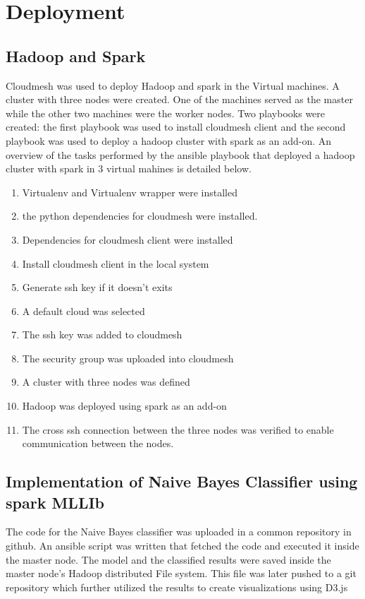 \documentclass[9pt,twocolumn,twoside]{styles/osajnl}
\begin{document}
\section{Deployment}
\subsection{Hadoop and Spark}
Cloudmesh was used to deploy Hadoop and spark in the Virtual machines. A cluster with three nodes were created. One of the machines served as the master while the other two machines were the worker nodes. Two playbooks were created: the first playbook was used to install cloudmesh client and the second playbook was used to deploy a hadoop cluster with spark as an add-on. An overview of the tasks performed by the ansible playbook  that deployed a hadoop cluster with spark in 3 virtual mahines is detailed below.
\begin{enumerate}
    \item Virtualenv and Virtualenv wrapper were installed
    \item the python dependencies for cloudmesh were installed.
    \item Dependencies for cloudmesh client were installed
    \item Install cloudmesh client in the local system
    \item Generate ssh key if it doesn't exits
    \item A default cloud was selected
    \item The ssh key was added to cloudmesh
    \item The security group was uploaded into cloudmesh
    \item A cluster with three nodes was defined 
    \item Hadoop was deployed using spark as an add-on 
    \item The cross ssh connection between the three nodes was verified to enable communication between the nodes.
\end{enumerate}

\subsection{Implementation of Naive Bayes Classifier using spark MLLIb}
The code for the Naive Bayes classifier was uploaded in a common repository in github. An ansible script was written that fetched the code and executed it inside the master node. The model and the classified results were saved inside the master node's Hadoop distributed File system. This file was later pushed to a git repository which further utilized the results to create visualizations using D3.js
\end{document}
